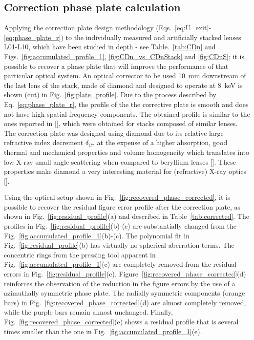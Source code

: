 \begin{refsection}
\subsection{Correction phase plate calculation}\label{sec:cpp_calculation}

Applying the correction plate design methodology (Eqs.~\ref{eq:U_exit}-\ref{eq:phase_plate_r}) to the individually measured and artificially stacked lenses L01-L10, which have been studied in depth - see Table.~\ref{tab:CDn} and Figs.~\ref{fig:accumulated_profile_1}, \ref{fig:CDn_vs_CDnStack} and \ref{fig:CDnS}; it is possible to recover a phase plate that will improve the performance of that particular optical system. An optical corrector to be used 10~mm downstream of the last lens of the stack, made of diamond and designed to operate at 8~keV is shown (cut) in Fig.~\ref{fig:plate_profile}. Due to the process described by  Eq.~\ref{eq:phase_plate_r}, the profile of the the corrective plate is smooth and does not have high spatial-frequency components. The obtained profile is similar to the ones reported in [\cite{Seiboth2017,Seiboth2018,Seiboth2020}], which were obtained for stacks composed of similar lenses. The correction plate was designed using diamond due to its relative large refractive index decrement $\delta_\text{C*}$ at the expense of a higher absorption, good thermal and mechanical properties and volume homogeneity which translates into low X-ray small angle scattering when compared to beryllium lenses [\cite{Chubar2020}]. These properties make diamond a very interesting material for (refractive) X-ray optics [\cite{Polikarpov2016b,ShvydKo2017}].

Using the optical setup shown in Fig.~\ref{fig:recovered_phase_corrected}, it is possible to recover the residual figure error profile after the correction plate, as shown in Fig.~\ref{fig:residual_profile}(a) and described in Table~\ref{tab:corrected}. The profiles in Fig.~\ref{fig:residual_profile}(b)-(c) are substantially changed from the Fig.~\ref{fig:accumulated_profile_1}(b)-(c). The polynomial fit in Fig.~\ref{fig:residual_profile}(b) has virtually no spherical aberration terms. The concentric rings from the pressing tool apparent in Fig.~\ref{fig:accumulated_profile_1}(c) are completely removed from the residual errors in Fig.~\ref{fig:residual_profile}(c). Figure~\ref{fig:recovered_phase_corrected}(d) reinforces the observation of the reduction in the figure errors by the use of a azimuthally symmetric phase plate. The radially symmetric components (orange bars) in Fig.~\ref{fig:recovered_phase_corrected}(d) are almost completely removed, while the purple bars remain almost unchanged. Finally, Fig.~\ref{fig:recovered_phase_corrected}(e) shows a residual profile that is several times smaller than the one in Fig.~\ref{fig:accumulated_profile_1}(e).


\end{refsection}
